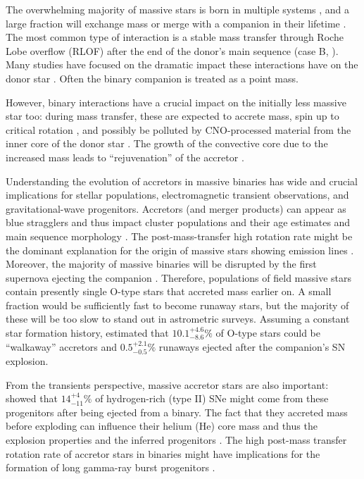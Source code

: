 \documentclass[twocolumn,twocolappendix,trackchanges]{aastex63}
\newcommand{\todo}[1]{{\large $\blacksquare$~\textbf{\color{red}[#1]}}~$\blacksquare$}
\begin{document}
The overwhelming majority of massive stars is born in multiple systems
\citep[e.g.,][]{mason:09, almeida:17}, and a large fraction will
exchange mass or merge with a companion in their lifetime
\citep[e.g.,][]{sana:12}. The most common type of interaction is a
stable mass transfer through Roche Lobe overflow (RLOF) after the end of the donor's main sequence (case
B, \citealt{kippenhahn:67}).  Many
studies %
have focused on the dramatic impact these interactions have on the
donor star \citep[e.g.,][]{morton:60, yoon:17, gotberg:17, gotberg:18, laplace:20,
  laplace:21, blagorodnova:21}. Often the binary companion is treated as a point mass.

However, binary interactions have a crucial impact on the initially
less massive star too: during mass transfer, these are expected to
accrete mass, spin up to critical rotation
\citep[e.g.,][]{packet:81}, and possibly be polluted by
CNO-processed material from the inner core of the donor star
\citep[e.g.,][]{blaauw:93}. The growth of
the convective core due to the increased mass leads to
``rejuvenation'' of the accretor \citep[e.g.,][]{neo:77, schneider:16}.

Understanding the evolution of accretors in massive binaries has wide
and crucial implications for stellar populations, electromagnetic
transient observations, and gravitational-wave progenitors. Accretors
(and merger products) can appear as blue stragglers \citep[e.g.,][]{chen:09, chen:10} and thus impact cluster
populations and their age estimates and main sequence morphology
\citep[e.g.,][]{pols_marinus:94, wang:20}. The post-mass-transfer high
rotation rate might be the dominant explanation for the origin of
massive stars showing emission lines \citep[e.g.,][]{bodensteiner:20,
  vinciguerra:20}. Moreover, the majority of massive binaries will be
disrupted by the first supernova ejecting the companion
\citep[``binary SN scenario'', ][]{blaauw:61, dedonder:97,
  eldridge:11, boubert:18, renzo:19walk, evans:20}. Therefore,
populations of field massive stars contain presently single O-type
stars that accreted mass earlier on. A small fraction would be
sufficiently fast to become runaway stars, but the majority of these will be too
slow to stand out in astrometric surveys. Assuming a constant star
formation history, \cite{renzo:19walk} estimated that
$10.1^{+4.6}_{-8.6}\%$ of O-type stars could be ``walkaway'' accretors
and $0.5^{+2.1}_{-0.5}\%$ runaways ejected after the companion's SN explosion.


From the transients perspective, massive accretor stars are also
important: \cite{zapartas:19} showed that $14_{-11}^{+4}\%$ of
hydrogen-rich (type II) SNe might come from these progenitors after
being ejected from a binary. The fact that they accreted mass before
exploding can influence their helium (He) core mass and thus the
explosion properties and the inferred progenitors
\citep{zapartas:21}. The high post-mass transfer rotation rate of
accretor stars in binaries might have implications for the formation
of long gamma-ray burst progenitors \citep{cantiello:07}.
\end{document}
